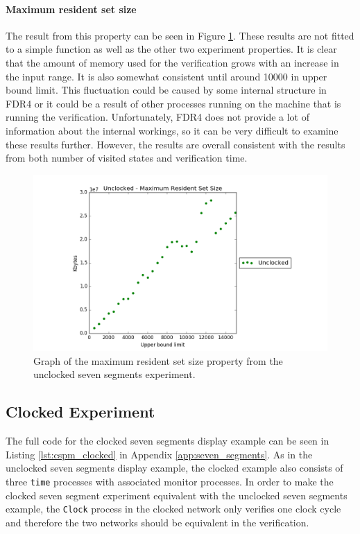 \paragraph{Maximum resident set size}
The result from this property can be seen in Figure \ref{fig:unclocked_resident_size}. These results are not fitted to a simple function as well as the other two experiment properties. It is clear that the amount of memory used for the verification grows with an increase in the input range. It is also somewhat consistent until around 10000 in upper bound limit. This fluctuation could be caused by some internal structure in FDR4 or it could be a result of other processes running on the machine that is running the verification. Unfortunately, FDR4 does not provide a lot of information about the internal workings, so it can be very difficult to examine these results further. However, the results are overall consistent with the results from both number of visited states and verification time.
\begin{figure}
    \centering
    \includegraphics[scale=0.6]{./figures/plots/unclocked_size.png}
\caption{Graph of the maximum resident set size property from the unclocked seven segments experiment.}
\label{fig:unclocked_resident_size}
\end{figure}

\subsection{Clocked Experiment}
The full code for the clocked seven segments display example can be seen in Listing \ref{lst:cspm_clocked} in Appendix \ref{app:seven_segments}.
As in the unclocked seven segments display example, the clocked example also consists of three \texttt{time} processes with associated monitor processes.
In order to make the clocked seven segment experiment equivalent with the unclocked seven segments example, the \texttt{Clock} process in the clocked network only verifies one clock cycle and therefore the two networks should be equivalent in the verification.
